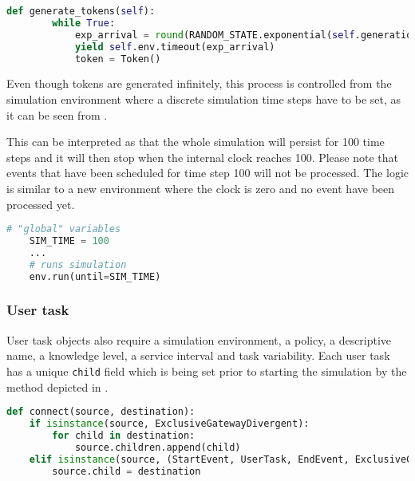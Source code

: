\documentclass{seal_thesis}
\begin{document}
\begin{lstlisting}[caption=Token generation method for start event object,label=lst:generate_tokens,language=Python]
    def generate_tokens(self):
        while True:
            exp_arrival = round(RANDOM_STATE.exponential(self.generation_interval), 1)
            yield self.env.timeout(exp_arrival)
            token = Token()
\end{lstlisting}

Even though tokens are generated infinitely, this process is controlled from the simulation environment where a discrete simulation time steps have to be set, as it can be seen from . 

This can be interpreted as that the whole simulation will persist for 100 time steps and it will then stop when the internal clock reaches 100. Please note that events that have been scheduled for time step 100 will not be processed. The logic is similar to a new environment where the clock is zero and no event have been processed yet.

\begin{lstlisting}[caption=Starting the simulation with discrete time steps,label=lst:simulation_steps,language=Python]
    # "global" variables
    SIM_TIME = 100
    ...
    # runs simulation
    env.run(until=SIM_TIME)
\end{lstlisting}

\subsubsection{User task}

User task objects also require a simulation environment, a policy, a descriptive name, a knowledge level, a service interval and task variability. Each user task has a unique \texttt{child} field which is being set prior to starting the simulation by the method depicted in .

\begin{lstlisting}[caption=Method used to connect workflow elements,label=lst:connect,language=Python]
    def connect(source, destination):
    if isinstance(source, ExclusiveGatewayDivergent):
        for child in destination:
            source.children.append(child)
    elif isinstance(source, (StartEvent, UserTask, EndEvent, ExclusiveGatewayConvergent)):
        source.child = destination
\end{lstlisting}
\end{document}
